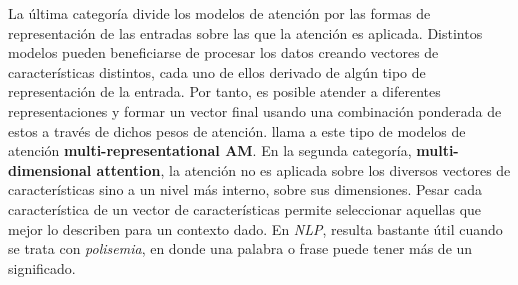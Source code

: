 La última categoría divide los modelos de atención por las formas de representación de las entradas
sobre las que la atención es aplicada. Distintos modelos pueden beneficiarse de procesar los datos
creando vectores de características distintos, cada uno de ellos derivado de algún tipo de representación
de la entrada. Por tanto, es posible atender a diferentes representaciones y formar un vector final
usando una combinación ponderada de estos a través de dichos pesos de atención.
\citeauthor{DBLP:journals/corr/abs-1904-02874} llama a este tipo de modelos de atención
\textbf{multi-representational AM}. En la segunda categoría, \textbf{multi-dimensional attention}, la
atención no es aplicada sobre los diversos vectores de características sino a un nivel más interno,
sobre sus dimensiones. Pesar cada característica de un vector de características permite seleccionar
aquellas que mejor lo describen para un contexto dado. En \textit{NLP}, resulta bastante útil cuando se
trata con \textit{polisemia}, en donde una palabra o frase puede tener más de un significado.
